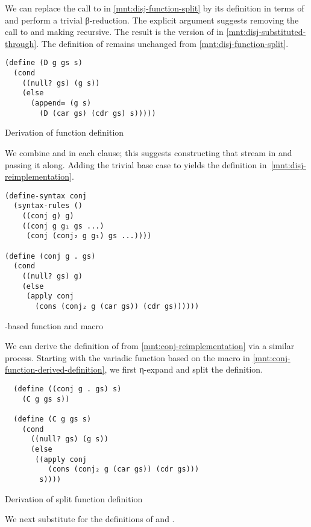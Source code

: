 \documentclass[sigplan,draft,balance,pbalance,natbib=false]{acmart}
\begin{document}
\noindent We can replace the call to  in
\cref{mnt:disj-function-split} by its definition in terms of
 and perform a trivial β-reduction. The explicit
 argument suggests removing the call to
 and making  recursive. The result is
the version of  in \cref{mnt:disj-substituted-through}.
The definition of  remains unchanged from
\cref{mnt:disj-function-split}.

\begin{listing}[h]
\begin{verbatim}
(define (D g gs s)
  (cond
    ((null? gs) (g s))
    (else
      (append∞ (g s)
        (D (car gs) (cdr gs) s)))))
\end{verbatim}
  \caption{Derivation of  function definition}
  \label{mnt:disj-substituted-through}
\end{listing}

\noindent We combine  and  in each clause;
this suggests constructing that stream in  and
passing it along. Adding the trivial base case to 
yields the definition in~\cref{mnt:disj-reimplementation}.

\begin{listing}[h]
\begin{verbatim}
(define-syntax conj
  (syntax-rules ()
    ((conj g) g)
    ((conj g g₁ gs ...)
     (conj (conj₂ g g₁) gs ...))))

(define (conj g . gs)
  (cond
    ((null? gs) g)
    (else
     (apply conj
       (cons (conj₂ g (car gs)) (cdr gs))))))
\end{verbatim}
  \caption{-based  function and macro}
  \label{mnt:conj-function-derived-definition}
\end{listing}

We can derive the definition of  from
\cref{mnt:conj-reimplementation} via a similar process. Starting with
the variadic function based on the macro in
\cref{mnt:conj-function-derived-definition}, we first η-expand and
split the definition.

\begin{listing}[h]
\begin{verbatim}
  (define ((conj g . gs) s)
    (C g gs s))

  (define (C g gs s)
    (cond
      ((null? gs) (g s))
      (else
       ((apply conj
          (cons (conj₂ g (car gs)) (cdr gs)))
        s))))
\end{verbatim}
  \caption{Derivation of split  function definition}
  \label{mnt:conj-substituted-through}
\end{listing}
\noindent We next substitute for the definitions of  and
.
\end{document}
